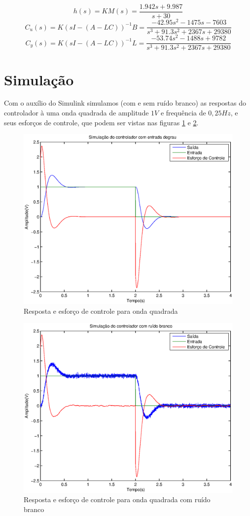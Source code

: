 \documentclass{article}
\begin{document}
\begin{equation}
\label{eq:hs}
h(s) = KM(s) = \frac{1.942s+9.987}{s+30}
\end{equation}
\begin{equation}
\label{eq:cus}
C_u(s) = K(sI - (A - LC))^{-1}B = \frac{-42.95s^2-1475s-7603}{s^3+91.3s^2+2367s+29380}
\end{equation}
\begin{equation}
\label{eq:cys}
C_y(s) = K(sI - (A - LC))^{-1}L = \frac{-53.74s^2-1488s+9782}{s^3+91.3s^2+2367s+29380}
\end{equation}


\section{Simulação}
Com o auxílio do Simulink simulamos (com e sem ruído branco) as respostas do controlador à uma onda quadrada de amplitude $1V$ e frequência de $0,25Hz$, e seus esforços de controle, que podem ser vistas nas figuras \ref{fig:yur} e \ref{fig:yurN}.
\begin{figure}[H]
	\centering
	\includegraphics[width=0.8\linewidth]{../yur}
	\caption{Resposta e esforço de controle para onda quadrada}
	\label{fig:yur}
\end{figure}
\begin{figure}[H]
	\centering
	\includegraphics[width=0.8\linewidth]{../yurN}
	\caption{Resposta e esforço de controle para onda quadrada com ruído branco}
	\label{fig:yurN}
\end{figure}
\end{document}
